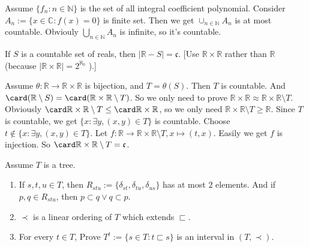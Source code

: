 \documentclass{ctexart}
\begin{document}
\begin{solution}
  Assume \(\{f_n:n \in \mathbb{N}\}\) is the set of all integral coefficient polynomial.
  Consider \(A_n:=\{x \in \mathbb{C}:f(x)=0\}\) is finite set. Then we get \(\cup_{n \in \mathbb{N}}A_n\) is at most countable. 
  Obviouly \(\bigcup_{n \in \mathbb{N} } A_n\) is infinite, so it's countable. 
\end{solution}
\begin{problem}
If $S$ is a countable set of reals, then $|\mathbb{R}-S|=\mathfrak{c}$.
[Use $\mathbb{R} \times \mathbb{R}$ rather than $\mathbb{R}$ (because $|\mathbb{R} \times \mathbb{R}|=2^{\aleph_0}$ ).]
\end{problem}

\begin{solution}
  Assume \(\theta:\mathbb{R} \to \mathbb{R} \times \mathbb{R}\) is bijection, and \(T=\theta(S)\). 
  Then \(T\) is countable. And \(\card (\mathbb{R}\setminus S)= \card (\mathbb{R} \times \mathbb{R} \setminus T)\). 
  So we only need to prove \(\mathbb{R}\times \mathbb{R} \approx \mathbb{R} \times \mathbb{R} \setminus T\). 
  Obviously \(\card \mathbb{R}\times \mathbb{R} \setminus T \leq \card \mathbb{R} \times \mathbb{R}\), so we only need
  \(\mathbb{R}\times \mathbb{R} \setminus T \geq \mathbb{R}\). 
  Since \(T\) is countable, we get \(\{x:\exists y,(x,y) \in T\}\) is countable. 
  Choose \(t \notin \{x:\exists y,(x,y) \in T\}\). 
  Let \(f:\mathbb{R} \to \mathbb{R} \times \mathbb{R} \setminus T,x \mapsto (t,x)\). 
  Easily we get \(f\) is injection. So \(\card \mathbb{R} \times \mathbb{R} \setminus T=\mathfrak{c}\). 
\end{solution}

\begin{problem}
  Assume \(T\) is a tree. 
  \begin{enumerate}[ref=\theproblem.\arabic*]
    \item \label{it:1}If \(s,t,u \in T\), then \(R_{stu} :=\{\delta_{st} ,\delta_{tu} ,\delta_{us} \}\) has at most \(2\) elements. 
      And if \(p,q \in R_{stu}\), then \(p \subset q \vee q \subset p\). 
    \item \label{it:2}\(\prec \) is a linear ordering of \(T\) which extends \(\sqsubset\). 
    \item \label{it:3}For every \(t \in T\), Prove \(T^t:=\{s \in T:t \sqsubset s\}\) is an interval in \((T,\prec)\). 
  \end{enumerate}
\end{problem}
\end{document}
